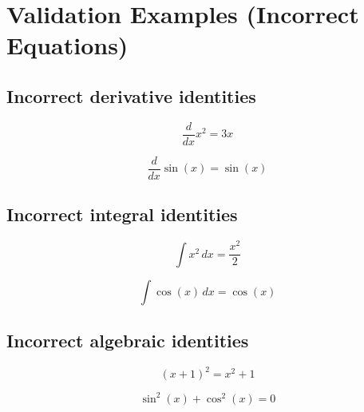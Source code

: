 \documentclass{article}
\begin{document}

\section*{Validation Examples (Incorrect Equations)}

\subsection*{Incorrect derivative identities}
\begin{equation}
\frac{d}{dx} x^2 = 3x
\end{equation}

\begin{equation}
\frac{d}{dx} \sin(x) = \sin(x)
\end{equation}

\subsection*{Incorrect integral identities}
\begin{equation}
\int x^2\,dx = \frac{x^2}{2}
\end{equation}

\begin{equation}
\int \cos(x)\,dx = \cos(x)
\end{equation}

\subsection*{Incorrect algebraic identities}
\begin{equation}
(x+1)^2 = x^2 + 1
\end{equation}

\begin{equation}
\sin^2(x) + \cos^2(x) = 0
\end{equation}
\end{document}
